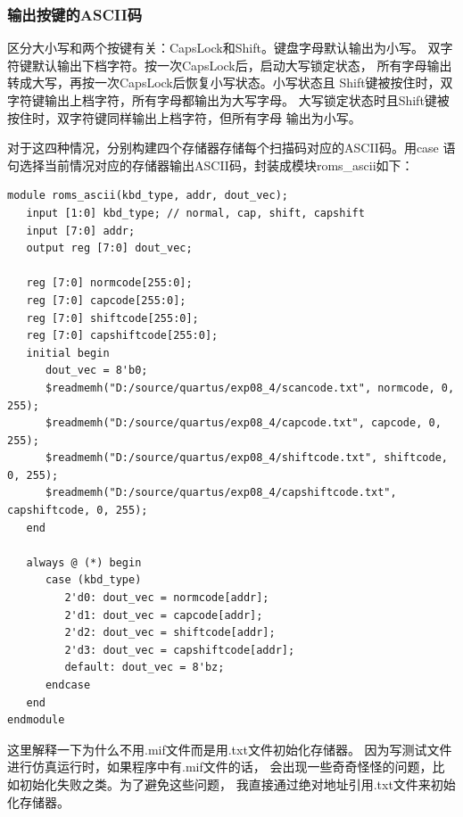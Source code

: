 \documentclass[12pt,a4paper,UTF8]{article}
\begin{document}
\subsubsection{输出按键的ASCII码}
\label{bbsec:ascii}
区分大小写和两个按键有关：CapsLock和Shift。键盘字母默认输出为小写。
双字符键默认输出下档字符。按一次CapsLock后，启动大写锁定状态，
所有字母输出转成大写，再按一次CapsLock后恢复小写状态。小写状态且
Shift键被按住时，双字符键输出上档字符，所有字母都输出为大写字母。
大写锁定状态时且Shift键被按住时，双字符键同样输出上档字符，但所有字母
输出为小写。

对于这四种情况，分别构建四个存储器存储每个扫描码对应的ASCII码。用case
语句选择当前情况对应的存储器输出ASCII码，封装成模块\mbox{roms\_ascii}\linebreak[4]
如下：
\begin{lstlisting}[style=verilog-style]
module roms_ascii(kbd_type, addr, dout_vec);
   input [1:0] kbd_type; // normal, cap, shift, capshift 
   input [7:0] addr;
   output reg [7:0] dout_vec;
   
   reg [7:0] normcode[255:0];
   reg [7:0] capcode[255:0];
   reg [7:0] shiftcode[255:0];
   reg [7:0] capshiftcode[255:0];
   initial begin
      dout_vec = 8'b0;
      $readmemh("D:/source/quartus/exp08_4/scancode.txt", normcode, 0, 255);
      $readmemh("D:/source/quartus/exp08_4/capcode.txt", capcode, 0, 255);
      $readmemh("D:/source/quartus/exp08_4/shiftcode.txt", shiftcode, 0, 255);
      $readmemh("D:/source/quartus/exp08_4/capshiftcode.txt", capshiftcode, 0, 255);
   end
      
   always @ (*) begin
      case (kbd_type)
         2'd0: dout_vec = normcode[addr];
         2'd1: dout_vec = capcode[addr];
         2'd2: dout_vec = shiftcode[addr];
         2'd3: dout_vec = capshiftcode[addr];
         default: dout_vec = 8'bz;
      endcase
   end
endmodule
\end{lstlisting}

这里解释一下为什么不用.mif文件而是用.txt文件初始化存储器。
因为写测试文件进行仿真运行时，如果程序中有.mif文件的话，
会出现一些奇奇怪怪的问题，比如初始化失败之类。为了避免这些问题，
我直接通过绝对地址引用.txt文件来初始化存储器。
\end{document}
